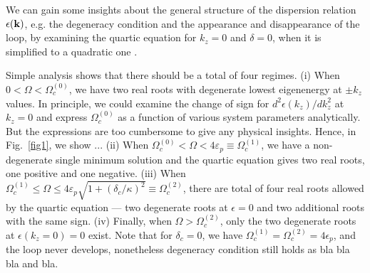\documentclass[atoms,article,submit,moreauthors,pdftex,12pt,a4paper]{mdpi}
\begin{document}
We can gain some insights about the general structure of the dispersion relation $\epsilon({\bf k})$, e.g. the degeneracy condition and the appearance and disappearance of the loop, by examining the quartic equation for $k_z=0$ and $\delta=0$, when it is simplified to a quadratic one  \cite{cavitySOC}.  

Simple analysis shows that there should be a total of four regimes. 
(i) When $0<\Omega<\Omega_c^{(0)}$, we have two real roots with degenerate lowest eigenenergy at $\pm k_z$ values. In principle, we could examine the change of sign for $d^2\epsilon(k_z)/dk_z^2$ at $k_z=0$ and express $\Omega_c^{(0)}$ as a function of various system parameters analytically. But the expressions are too cumbersome to give any physical insights. Hence, in Fig.~\ref{fig1}, we show ...  
(ii) When $\Omega_c^{(0)} < \Omega <4\varepsilon_p\equiv\Omega_c^{(1)}$, we have a non-degenerate single minimum solution and the quartic equation gives two real roots, one positive and one negative. 
(iii) When $\Omega_c^{(1)} \leq \Omega \leq  4\varepsilon_p \sqrt{1+(\delta_c/\kappa)^2}\equiv\Omega_c^{(2)}$, there are total of four real roots allowed by the quartic equation --- two degenerate roots at $\epsilon=0$ and two additional roots with the same sign. 
(iv) Finally, when $\Omega > \Omega_c^{(2)}$, only the two degenerate roots at $\epsilon(k_z=0)=0$ exist.
Note that for $\delta_c=0$, we have $\Omega_c^{(1)}=\Omega_c^{(2)}=4\epsilon_p$, and the loop never develops, nonetheless degeneracy condition still holds as {\color{red} bla bla bla and bla}. 

\end{document}
